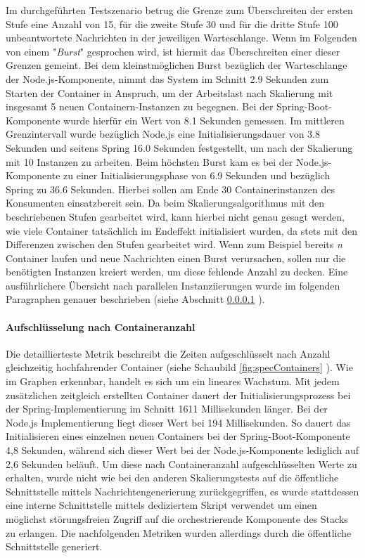 Im durchgeführten Testszenario betrug die Grenze zum Überschreiten der ersten Stufe eine Anzahl von 15, für die zweite Stufe 30 und für die dritte Stufe 100 unbeantwortete Nachrichten in der jeweiligen Warteschlange. Wenn im Folgenden von einem "\emph{Burst}" gesprochen wird, ist hiermit das Überschreiten einer dieser Grenzen gemeint. Bei dem kleinstmöglichen Burst bezüglich der Warteschlange der Node.js-Komponente, nimmt das System im Schnitt 2.9 Sekunden zum Starten der Container in Anspruch, um der Arbeitslast nach Skalierung mit insgesamt 5 neuen Containern-Instanzen zu begegnen. Bei der Spring-Boot-Komponente wurde hierfür ein Wert von 8.1 Sekunden gemessen. Im mittleren Grenzintervall wurde bezüglich Node.js eine Initialisierungsdauer von 3.8 Sekunden und seitens Spring 16.0 Sekunden festgestellt, um nach der Skalierung mit 10 Instanzen zu arbeiten. Beim höchsten Burst kam es bei der Node.js-Komponente zu einer Initialisierungsphase von 6.9 Sekunden und bezüglich Spring zu 36.6 Sekunden. Hierbei sollen am Ende 30 Containerinstanzen des Konsumenten einsatzbereit sein. Da beim Skalierungsalgorithmus mit den beschriebenen Stufen gearbeitet wird, kann hierbei nicht genau gesagt werden, wie viele Container tatsächlich im Endeffekt initialisiert wurden, da stets mit den Differenzen zwischen den Stufen gearbeitet wird. Wenn zum Beispiel bereits \emph{n} Container laufen und neue Nachrichten einen Burst verursachen, sollen nur die benötigten Instanzen kreiert werden, um diese fehlende Anzahl zu decken. Eine ausführlichere Übersicht nach parallelen Instanziierungen wurde im folgenden Paragraphen genauer beschrieben (siehe Abschnitt \ref{par:specContainer} ).


\paragraph{Aufschlüsselung nach Containeranzahl}
\label{par:specContainer}
Die detaillierteste Metrik beschreibt die Zeiten aufgeschlüsselt nach Anzahl gleichzeitig hochfahrender Container (siehe Schaubild \ref{fig:specContainers} ). Wie im Graphen erkennbar, handelt es sich um ein lineares Wachstum. Mit jedem zusätzlichen zeitgleich erstellten Container dauert der Initialisierungsprozess bei der Spring-Implementierung im Schnitt 1611 Millisekunden länger. Bei der Node.js Implementierung liegt dieser Wert bei 194 Millisekunden. So dauert das Initialisieren eines einzelnen neuen Containers bei der Spring-Boot-Komponente 4,8 Sekunden, während sich dieser Wert bei der Node.js-Komponente lediglich auf 2,6 Sekunden beläuft. Um diese nach Containeranzahl aufgeschlüsselten Werte zu erhalten, wurde nicht wie bei den anderen Skalierungstests auf die öffentliche Schnittstelle mittels Nachrichtengenerierung zurückgegriffen, es wurde stattdessen eine interne Schnittstelle mittels dediziertem Skript verwendet um einen möglichst störungsfreien Zugriff auf die orchestrierende Komponente des Stacks zu erlangen. Die nachfolgenden Metriken wurden allerdings durch die öffentliche Schnittstelle generiert.

